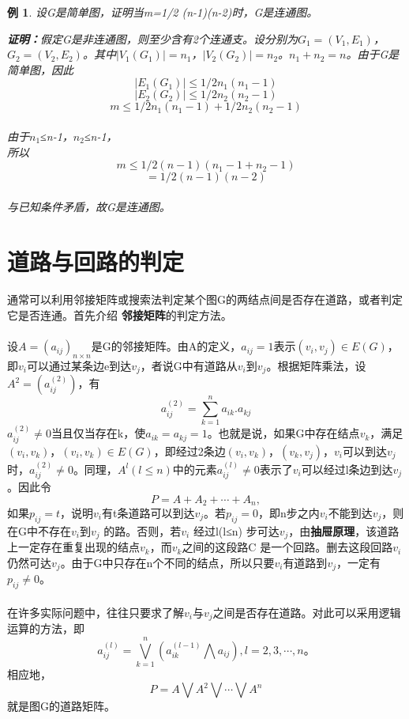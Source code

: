 \documentclass[a4paper,11pt]{book}
\newtheorem{sample}{\textbf{例}}[section]
\begin{document}
\begin{sample}
设G是简单图，证明当m=1/2 (n-1)(n-2)时，G是连通图。
\begin{adjustwidth}{0.62cm}{0.62cm}
\textbf{证明：}假定G是非连通图，则至少含有2个连通支。设分别为$G_1=(V_1,E_1)$，$G_2=(V_2,E_2)$。其中$|V_1 (G_1 )|=n_1$，$|V_2 (G_2 )|=n_2$。$n_1+n_2=n$。由于G是简单图，因此$$|E_1 (G_1 )|\leq1/2 n_1(n_1-1)$$$$|E_2 (G_2 )|\leq1/2 n_2 (n_2-1)$$$$m\leq1/2 n_1(n_1-1)+1/2 n_2(n_2-1)$$\\
由于$n_1$≤n-1，$n_2$≤n-1，\\
所以$$m\leq1/2 (n-1)(n_1-1+n_2-1)$$$$=1/2 (n-1)(n-2)$$\\
与已知条件矛盾，故G是连通图。
%
\end{adjustwidth}
\end{sample}

\section{道路与回路的判定}
\paragraph{}通常可以利用邻接矩阵或搜索法判定某个图G的两结点间是否存在道路，或者判定它是否连通。首先介绍\textbf{ 邻接矩阵}的判定方法。
\paragraph{}设$A=(a_{ij})_{n\times n}$是G的邻接矩阵。由A的定义，$a_{ij}=1$表示$(v_i,v_j )\in E(G)$，即$v_i$可以通过某条边e到达$v_j$，者说G中有道路从$v_i$到$v_j$。根据矩阵乘法，设$A^2=(a_{ij}^{(2)})$，有
\begin{displaymath}
a_{ij}^{(2)}=\sum_{k=1}^{n}a_{ik}.a_{kj}
\end{displaymath}
$a_{ij}^{(2)}\neq 0$当且仅当存在k，使$a_{ik}=a_{kj}=1$。也就是说，如果G中存在结点$v_k$，满足$(v_i,v_k )$，$(v_i,v_k )\in E(G)$，即经过2条边$(v_i,v_k)$，$(v_k,v_j)$，$v_i$可以到达$v_j$时，$a_{ij}^{(2)}\neq 0$。同理，$A^l(l≤n)$中的元素$a_{ij}^{(l)}\neq0$表示了$v_i$可以经过l条边到达$v_j$。因此令$$P=A+A_2+\cdots+A_n,$$如果$p_{ij}=t$，说明$v_i$有t条道路可以到达$v_j$。若$p_{ij}=0$，即n步之内$v_i$不能到达$v_j$，则在G中不存在$v_i$到$v_j$ 的路。否则，若$v_i$ 经过l(l≤n) 步可达$v_j$，由\textbf{抽屉原理}，该道路上一定存在重复出现的结点$v_k$，而$v_k$之间的这段路C 是一个回路。删去这段回路$v_i$ 仍然可达$v_j$。由于G中只存在n个不同的结点，所以只要$v_i$有道路到$v_j$，一定有$p_{ij}≠0$。
\paragraph{}在许多实际问题中，往往只要求了解$v_i$与$v_j$之间是否存在道路。对此可以采用逻辑运算的方法，即$$a_{ij}^{(l)}=\bigvee_{k=1}^{n}(a_{ik}^{(l-1)}\bigwedge a_{ij}),l=2,3,\cdots,n。$$相应地，$$P=A\bigvee A^2 \bigvee \cdots \bigvee A^n$$就是图G的道路矩阵。
\end{document}
